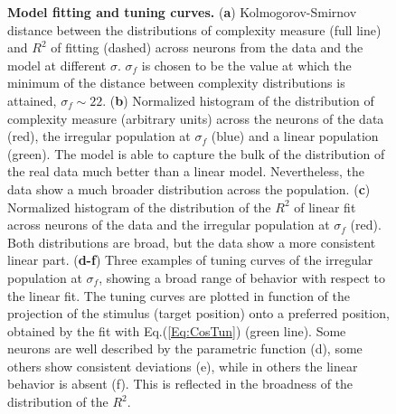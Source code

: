 \documentclass[a4paper]{article}%
\begin{document}
\begin{figure}[ptb]
\centering
{}\caption{ \textbf{Model
fitting and tuning curves.} (\textbf{a}) Kolmogorov-Smirnov distance between
the distributions of complexity measure (full line) and $R^{2}$ of fitting
(dashed) across neurons from the data and the model at different $\sigma$.
$\sigma_{f}$ is chosen to be the value at which the minimum of the distance
between complexity distributions is attained, $\sigma_{f}\sim22$. (\textbf{b})
Normalized histogram of the distribution of complexity measure (arbitrary
units) across the neurons of the data (red), the irregular population at
$\sigma_{f}$ (blue) and a linear population (green). The model is able to
capture the bulk of the distribution of the real data much better than a
linear model. Nevertheless, the data show a much broader distribution across
the population. (\textbf{c}) Normalized histogram of the distribution of the
$R^{2}$ of linear fit across neurons of the data and the irregular population
at $\sigma_{f}$ (red). Both distributions are broad, but the data show a more
consistent linear part. (\textbf{d-f}) Three examples of tuning curves of the
irregular population at $\sigma_{f}$, showing a broad range of behavior with
respect to the linear fit. The tuning curves are plotted in function of the
projection of the stimulus (target position) onto a preferred position,
obtained by the fit with Eq.(\ref{Eq:CosTun}) (green line). Some neurons are
well described by the parametric function (d), some others show consistent
deviations (e), while in others the linear behavior is absent (f). This is
reflected in the broadness of the distribution of the $R^{2}$. }%
\label{Fig:7}%
\end{figure}
\end{document}
